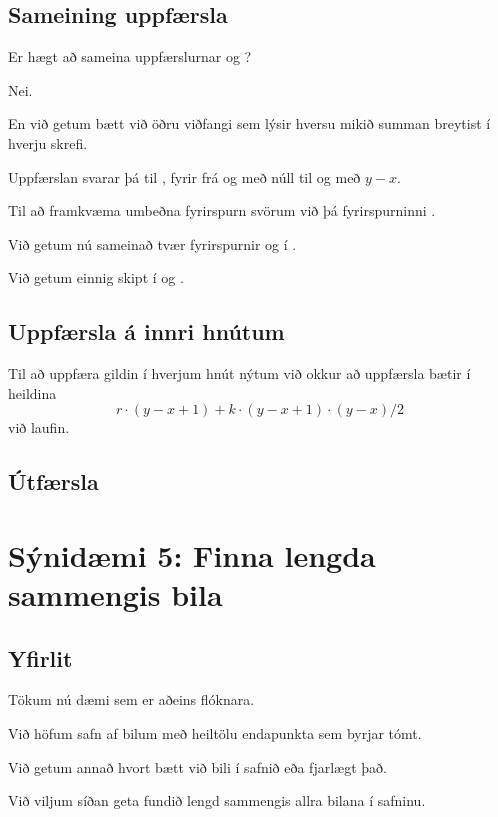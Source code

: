 \subsection{Sameining uppfærsla}
{
	{
		\item<1-> Er hægt að sameina uppfærslurnar  og ?
		\item<2-> Nei.
		\item<3-> En við getum bætt við öðru viðfangi sem lýsir hversu mikið summan breytist í hverju skrefi.
		\item<4-> Uppfærslan  svarar þá til , fyrir  frá og með núll til og með $y - x$.
		\item<5-> Til að framkvæma umbeðna fyrirspurn svörum við þá fyrirspurninni .
		\item<6-> Við getum nú sameinað tvær fyrirspurnir  og  í .
		\item<7-> Við getum einnig skipt  í  og .
	}
}

\subsection{Uppfærsla á innri hnútum}
{
	{
		\item<1-> Til að uppfæra gildin í hverjum hnút nýtum við okkur að uppfærsla  bætir í heildina 
\[
					r \cdot (y - x + 1) + k \cdot (y - x + 1) \cdot (y - x) / 2
\]
					við laufin.
	}
}

\subsection{Útfærsla}
{
}

{
}

\section{Sýnidæmi 5: Finna lengda sammengis bila}
\subsection{Yfirlit}
{
	{
		\item<1-> Tökum nú dæmi sem er aðeins flóknara.
		\item<2-> Við höfum safn af bilum með heiltölu endapunkta sem byrjar tómt.
		\item<3-> Við getum annað hvort bætt við bili í safnið eða fjarlægt það.
		\item<4-> Við viljum síðan geta fundið lengd sammengis allra bilana í safninu.
	}
}

